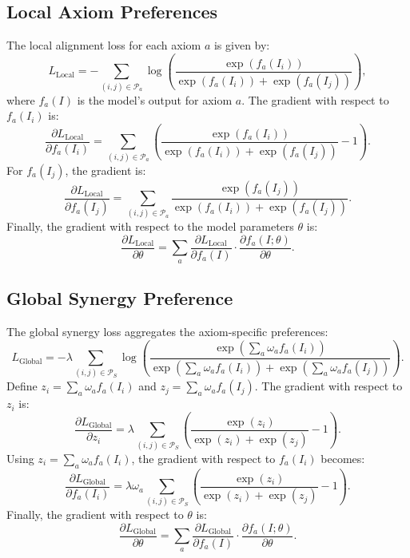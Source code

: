 \subsection{Local Axiom Preferences}
The local alignment loss for each axiom $a$ is given by:
\[
L_{\text{Local}} = - \sum_{(i, j) \in \mathcal{P}_{a}} \log \left( \frac{\exp(f_a(I_i))}{\exp(f_a(I_i)) + \exp(f_a(I_j))} \right),
\]
where $f_a(I)$ is the model’s output for axiom $a$. The gradient with respect to $f_a(I_i)$ is:
\[
\frac{\partial L_{\text{Local}}}{\partial f_a(I_i)} = \sum_{(i, j) \in \mathcal{P}_{a}} \left( \frac{\exp(f_a(I_i))}{\exp(f_a(I_i)) + \exp(f_a(I_j))} - 1 \right).
\]
For $f_a(I_j)$, the gradient is:
\[
\frac{\partial L_{\text{Local}}}{\partial f_a(I_j)} = \sum_{(i, j) \in \mathcal{P}_{a}} \frac{\exp(f_a(I_j))}{\exp(f_a(I_i)) + \exp(f_a(I_j))}.
\]
Finally, the gradient with respect to the model parameters $\theta$ is:
\[
\frac{\partial L_{\text{Local}}}{\partial \theta} = \sum_a \frac{\partial L_{\text{Local}}}{\partial f_a(I)} \cdot \frac{\partial f_a(I; \theta)}{\partial \theta}.
\]

\subsection{Global Synergy Preference}
The global synergy loss aggregates the axiom-specific preferences:
\[
L_{\text{Global}} = - \lambda \sum_{(i, j) \in \mathcal{P}_S} \log \left( \frac{\exp\left( \sum_a \omega_a f_a(I_i) \right)}{\exp\left( \sum_a \omega_a f_a(I_i) \right) + \exp\left( \sum_a \omega_a f_a(I_j) \right)} \right).
\]
Define $z_i = \sum_a \omega_a f_a(I_i)$ and $z_j = \sum_a \omega_a f_a(I_j)$. The gradient with respect to $z_i$ is:
\[
\frac{\partial L_{\text{Global}}}{\partial z_i} = \lambda \sum_{(i, j) \in \mathcal{P}_S} \left( \frac{\exp(z_i)}{\exp(z_i) + \exp(z_j)} - 1 \right).
\]
Using $z_i = \sum_a \omega_a f_a(I_i)$, the gradient with respect to $f_a(I_i)$ becomes:
\[
\frac{\partial L_{\text{Global}}}{\partial f_a(I_i)} = \lambda \omega_a \sum_{(i, j) \in \mathcal{P}_S} \left( \frac{\exp(z_i)}{\exp(z_i) + \exp(z_j)} - 1 \right).
\]
Finally, the gradient with respect to $\theta$ is:
\[
\frac{\partial L_{\text{Global}}}{\partial \theta} = \sum_a \frac{\partial L_{\text{Global}}}{\partial f_a(I)} \cdot \frac{\partial f_a(I; \theta)}{\partial \theta}.
\]

